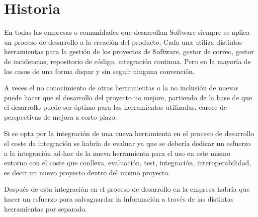 \section{Historia}
\label{sec:historia}

\par En todas las empresas o comunidades que desarrollan Software siempre se aplica un proceso de desarrollo a la creación del producto. Cada una utiliza distintas herramientas para la gesti\'on de los proyectos de Software, gestor de correo, gestor de incidencias, repositorio de c\'odigo, integraci\'on continua. Pero en la mayor\'ia de los casos de una forma dispar y sin seguir ninguna convención.

\par A veces el no conocimiento de otras herramientas o la no inclusión de nuevas puede hacer que el desarrollo del proyecto no mejore, partiendo de la base de que el desarrollo puede ser óptimo para las herramientas utilizadas, carece de perspectivas de mejora a corto plazo.

\par Si se opta por la integración de una nueva herramienta en el proceso de desarrollo el coste de integración se habría de evaluar ya que se debería dedicar un esfuerzo a la integración ad-hoc de la nueva herramienta para el uso en este mismo entorno con el coste que conlleva, evaluación, test, integración, interoperabilidad, es decir un nuevo proyecto dentro del mismo proyecto.

\par Después de esta integración en el proceso de desarrollo en la empresa habría que hacer un esfuerzo para salvaguardar la información a través de las distintas herramientas por separado.

